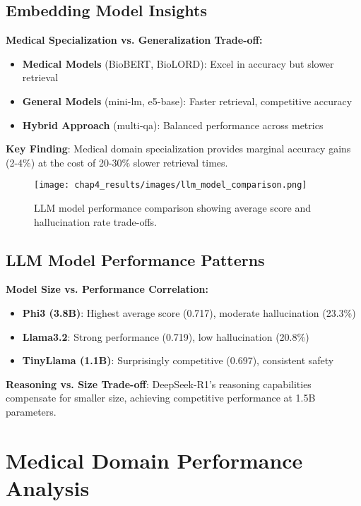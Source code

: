 \subsection{Embedding Model Insights}

\textbf{Medical Specialization vs. Generalization Trade-off:}
\begin{itemize}
    \item \textbf{Medical Models} (BioBERT, BioLORD): Excel in accuracy but slower retrieval
    \item \textbf{General Models} (mini-lm, e5-base): Faster retrieval, competitive accuracy
    \item \textbf{Hybrid Approach} (multi-qa): Balanced performance across metrics
\end{itemize}

\textbf{Key Finding}: Medical domain specialization provides marginal accuracy gains (2-4\%) at the cost of 20-30\% slower retrieval times.

\begin{figure}[!htbp]
    \centering
    \texttt{[image: chap4\_results/images/llm\_model\_comparison.png]}
    \caption{LLM model performance comparison showing average score and hallucination rate trade-offs.}
    \label{fig:llm_comparison}
\end{figure}

\subsection{LLM Model Performance Patterns}

\textbf{Model Size vs. Performance Correlation:}
\begin{itemize}
    \item \textbf{Phi3 (3.8B)}: Highest average score (0.717), moderate hallucination (23.3\%)
    \item \textbf{Llama3.2}: Strong performance (0.719), low hallucination (20.8\%)
    \item \textbf{TinyLlama (1.1B)}: Surprisingly competitive (0.697), consistent safety
\end{itemize}

\textbf{Reasoning vs. Size Trade-off}: DeepSeek-R1's reasoning capabilities compensate for smaller size, achieving competitive performance at 1.5B parameters.

\section{Medical Domain Performance Analysis}

